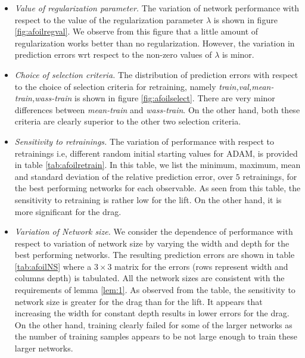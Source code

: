 \documentclass[a4paper]{article}
\numberwithin{equation}{section}
\numberwithin{equation}{section}
\theoremstyle{definition}
\theoremstyle{myremarkstyle}
\begin{document}
\begin{itemize}
\item \emph{Value of regularization parameter.} The variation of network performance with respect to the value of the regularization parameter $\lambda$ is shown in figure \ref{fig:afoilregval}. We observe from this figure that a little amount of regularization works better than no regularization. However, the variation in prediction errors wrt respect to the non-zero values of $\lambda$ is minor. 
\item \emph{Choice of selection criteria.} The distribution of prediction errors with respect to the choice of selection criteria for retraining, namely \emph{train,val,mean-train,wass-train} is shown in figure \ref{fig:afoilselect}. There are very minor differences between \emph{mean-train} and \emph{wass-train}. On the other hand, both these criteria are clearly superior to the other two selection criteria. 
\item \emph{Sensitivity to retrainings.} The variation of performance with respect to retrainings i.e, different random initial starting values for ADAM, is provided in table \ref{tab:afoilretrain}. In this table, we list the minimum, maximum, mean and standard deviation of the relative prediction error, over $5$ retrainings, for the best performing networks for each observable. As seen from this table, the sensitivity to retraining is rather low for the lift. On the other hand, it is more significant for the drag.
\item \emph{Variation of Network size.} We consider the dependence of performance with respect to variation of network size by varying the width and depth for the best performing networks. The resulting prediction errors are shown in table \ref{tab:afoilNS} where a $3 \times 3$ matrix for the errors (rows represent width and columns depth) is tabulated. All the network sizes are consistent with the requirements of lemma \ref{lem:1}. As observed from the table, the sensitivity to network size is greater for the drag than for the lift. It appears that increasing the width for constant depth results in lower errors for the drag. On the other hand, training clearly failed for some of the larger networks as the number of training samples appears to be not large enough to train these larger networks.
\end{itemize}
\end{document}
